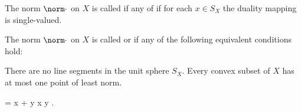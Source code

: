 \begin{definition}\label{def:smooth_norm}
  The norm \( \norm \cdot \) on \( X \) is called  if any of  if for each \( x \in S_X \) the duality mapping is single-valued.
\end{definition}

\begin{definition}\label{def:rotund_norm}
  The norm \( \norm \cdot \) on \( X \) is called  or  if any of the following equivalent conditions hold:
  \begin{thmenum}
     There are no line segments in the unit sphere \( S_X \).
     Every convex subset of \( X \) has at most one point of least norm.
    \begin{balign}\label{def:rotund_norm/linearly_dependent/equation}
       = \norm x + \norm y \implies x  y .
    \end{balign}
  \end{thmenum}
\end{definition}
